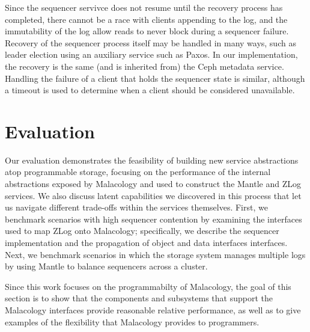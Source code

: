 \documentclass[preprint]{sigplanconf-eurosys}
\begin{document}
Since the sequencer servivce does not resume until the recovery process has
completed, there cannot be a race with clients appending to the log, and the
immutability of the log allow reads to never block during a sequencer failure.
Recovery of the sequencer process itself may be handled in many ways, such as
leader election using an auxiliary service such as Paxos. In our
implementation, the recovery is the same (and is inherited from) the Ceph
metadata service. Handling the failure of a client that holds the sequencer
state is similar, although a timeout is used to determine when a client should
be considered unavailable.

\section{Evaluation}
\label{sec:evaluation} 


Our evaluation demonstrates the feasibility of building new service abstractions
atop programmable storage, focusing on the
performance of the internal
abstractions exposed by Malacology and
used to construct the Mantle and ZLog services. We also discuss
latent capabilities we discovered in this process that let us navigate
different trade-offs within the services themselves. First, we benchmark
scenarios 
with high sequencer contention
by examining the interfaces used
to map ZLog onto Malacology; specifically, we describe the sequencer
implementation and the propagation of object and data interfaces interfaces.
Next, we benchmark scenarios in which the storage system manages multiple logs by using Mantle to
balance sequencers across a cluster.


Since this work
focuses on the programmabilty of Malacology, the goal of this section is to
show that the components and subsystems that support the Malacology interfaces
provide reasonable relative performance, as well as to give examples of the flexibility
that Malacology provides to programmers.
\end{document}
